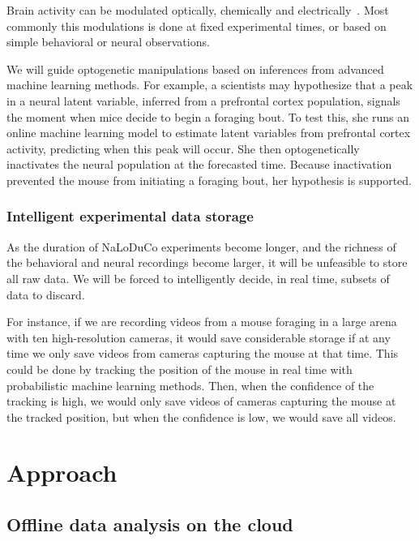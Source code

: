 \documentclass[12pt]{article}
\begin{document}
Brain activity can be modulated optically, chemically and
electrically~\citep{}.
%
Most commonly this modulations is done at fixed experimental times, or based on
simple behavioral or neural observations.

We will guide optogenetic manipulations based on inferences from advanced
machine learning methods.
%
For example, a scientists may hypothesize that a peak in a neural latent
variable, inferred from a prefrontal cortex population, signals the moment when
mice decide to begin a foraging bout.  To test this, she runs an online machine
learning model to estimate latent variables from prefrontal cortex activity,
predicting when this peak will occur. She then optogenetically inactivates the
neural population at the forecasted time.  Because inactivation prevented the
mouse from initiating a foraging bout, her hypothesis is supported.

\subsubsection*{Intelligent experimental data storage}

As the duration of NaLoDuCo experiments become longer, and the richness of the                                                              
behavioral and neural recordings become larger, it will be unfeasible to                                                                
store all raw data. We will be forced to intelligently decide, in real time,                                                                
subsets of data to discard.
                                                                                                                                            
For instance, if we are recording videos from a mouse foraging in a large arena
with ten high-resolution cameras, it would save considerable storage if at any
time we only save videos from cameras capturing the mouse at that time.  This
could be done by tracking the position of the mouse in real time with
probabilistic machine learning methods. Then, when the confidence of the
tracking is high, we would only save videos of cameras capturing the mouse at
the tracked position, but when the confidence is low, we would save all videos.

\section{Approach}

\subsection{Offline data analysis on the cloud}
\end{document}
